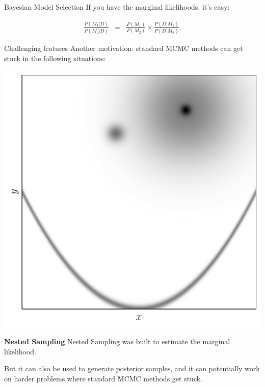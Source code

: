 \begin{frame}[t]{Bayesian Model Selection}
If you have the marginal likelihoods, it's easy:

\begin{eqnarray*}
\frac{P(M_1 | D)}{P(M_2 | D)} &=& \frac{P(M_1)}{P(M_2)}
\times \frac{P(D | M_1)}{P(D | M_2)}.
\end{eqnarray*}
\end{frame}


\begin{frame}[t]{Challenging features}
Another motivation: standard MCMC methods can get stuck in the following
situations:
\begin{center}
\includegraphics[scale=0.4]{challenges.pdf}
\end{center}
\end{frame}

\begin{frame}{\small{\textbf{Nested Sampling}}}
Nested Sampling was built to estimate the marginal likelihood.

But it can also be used to generate posterior samples, and it can potentially
work on harder problems where standard MCMC methods get stuck.
\end{frame}

